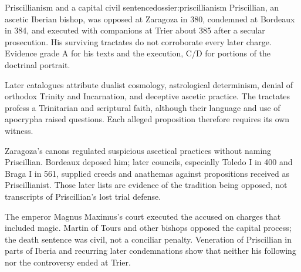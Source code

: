 \begin{heresydossier}{Priscillianism and a capital civil sentence}{dossier:priscillianism}
\objectfield Priscillian, an ascetic Iberian bishop, was opposed at Zaragoza in 380, condemned at Bordeaux in 384, and executed with companions at Trier about 385 after a secular prosecution. His surviving tractates do not corroborate every later charge. Evidence grade A for his texts and the execution, C/D for portions of the doctrinal portrait.

\propositionfield Later catalogues attribute dualist cosmology, astrological determinism, denial of orthodox Trinity and Incarnation, and deceptive ascetic practice. The tractates profess a Trinitarian and scriptural faith, although their language and use of apocrypha raised questions. Each alleged proposition therefore requires its own witness.

\responsefield Zaragoza's canons regulated suspicious ascetical practices without naming Priscillian. Bordeaux deposed him; later councils, especially Toledo I in 400 and Braga I in 561, supplied creeds and anathemas against propositions received as Priscillianist. Those later lists are evidence of the tradition being opposed, not transcripts of Priscillian's lost trial defense.

\aftermathfield The emperor Magnus Maximus's court executed the accused on charges that included magic. Martin of Tours and other bishops opposed the capital process; the death sentence was civil, not a conciliar penalty. Veneration of Priscillian in parts of Iberia and recurring later condemnations show that neither his following nor the controversy ended at Trier.
\end{heresydossier}

